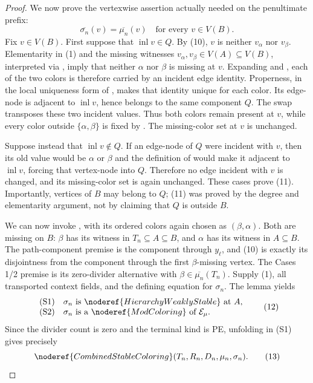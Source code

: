 \begin{proof}
We now prove the vertexwise assertion actually needed on the penultimate
prefix:
\[
 \overline{\sigma_n}(v)=\overline{\mu_n}(v)
                 \quad\text{for every }v\in V(B).              \tag{11}
\]
Fix \(v\in V(B)\).  First suppose that
\(\operatorname{inl}v\in Q\).  By (10), \(v\) is neither
\(v_\alpha\) nor \(v_\beta\).  Elementarity in (1) and the missing
witnesses \(v_\alpha,v_\beta\in V(A)\subseteq V(B)\), interpreted via
, imply that neither
\(\alpha\) nor \(\beta\) is missing at \(v\).  Expanding
 and , each of the two
colors is therefore carried by an incident edge identity.  Properness,
in the local uniqueness form of , makes that
identity unique for each color.  Its edge-node is adjacent to
\(\operatorname{inl}v\), hence belongs to the same component \(Q\).
The swap transposes these two incident values.  Thus both colors remain
present at \(v\), while every color outside
\(\{\alpha,\beta\}\) is fixed by
.  The missing-color set at \(v\) is
unchanged.

Suppose instead that \(\operatorname{inl}v\notin Q\).  If an edge-node
of \(Q\) were incident with \(v\), then its old value would be
\(\alpha\) or \(\beta\) and the definition of
 would make it adjacent to
\(\operatorname{inl}v\), forcing that vertex-node into \(Q\).  Therefore
no edge incident with \(v\) is changed, and its missing-color set is again
unchanged.  These cases prove (11).  Importantly, vertices of \(B\) may
belong to \(Q\); (11) was proved by the degree and elementarity argument,
not by claiming that \(Q\) is outside \(B\).

We can now invoke , with its ordered
colors again chosen as \((\beta,\alpha)\).  Both are missing on \(B\):
\(\beta\) has its witness in \(T_n\subseteq A\subseteq B\), and
\(\alpha\) has its witness in \(A\subseteq B\).  The path-component
premise is the component through \(y_\ell\), and (10) is exactly its
disjointness from the component through the first \(\beta\)-missing
vertex.  The Cases 1/2 premise is its zero-divider alternative with
\(\beta\in\overline{\mu_n}(T_n)\).  Supply (1), all transported context
fields, and the defining equation for \(\sigma_n\).  The lemma yields
\[
\begin{array}{ll}
\text{(S1)}&
 \sigma_n\text{ is }\noderef{HierarchyWeaklyStable}\text{ at }A,\\
\text{(S2)}&
 \sigma_n\text{ is a }\noderef{ModColoring}\text{ of }\mathcal E_\mu .
\end{array}                                                     \tag{12}
\]
Since the divider count is zero and the terminal kind is PE, unfolding
 in (S1) gives precisely
\[
 \noderef{CombinedStableColoring}
    (T_n,R_n,D_n,\mu_n,\sigma_n).                              \tag{13}
\]


\end{proof}
